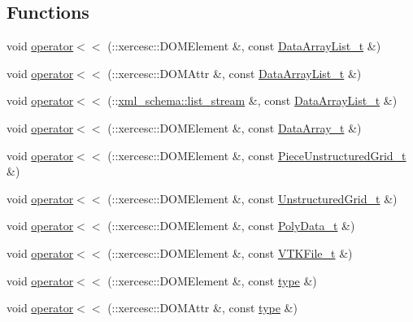 \subsection*{Functions}
\begin{DoxyCompactItemize}
\item 
void \hyperlink{vtk-unstructured_8h_a2721bf53923d5c5970c933ae5921f4dc}{operator$<$$<$} (\+::xercesc\+::\+D\+O\+M\+Element \&, const \hyperlink{classDataArrayList__t}{Data\+Array\+List\+\_\+t} \&)
\item 
void \hyperlink{vtk-unstructured_8h_a24556fd48a78f322cb82d7bcdc9c4ab9}{operator$<$$<$} (\+::xercesc\+::\+D\+O\+M\+Attr \&, const \hyperlink{classDataArrayList__t}{Data\+Array\+List\+\_\+t} \&)
\item 
void \hyperlink{vtk-unstructured_8h_a50f994a7e4e7766ad192e07d443a14e5}{operator$<$$<$} (\+::\hyperlink{namespacexml__schema_ab6c818ac91e70a25620375e0d000be83}{xml\+\_\+schema\+::list\+\_\+stream} \&, const \hyperlink{classDataArrayList__t}{Data\+Array\+List\+\_\+t} \&)
\item 
void \hyperlink{vtk-unstructured_8h_a1ef510bc9917a229ea37ca7045a47099}{operator$<$$<$} (\+::xercesc\+::\+D\+O\+M\+Element \&, const \hyperlink{classDataArray__t}{Data\+Array\+\_\+t} \&)
\item 
void \hyperlink{vtk-unstructured_8h_a126131a4ada1026f6eb13998253e4800}{operator$<$$<$} (\+::xercesc\+::\+D\+O\+M\+Element \&, const \hyperlink{classPieceUnstructuredGrid__t}{Piece\+Unstructured\+Grid\+\_\+t} \&)
\item 
void \hyperlink{vtk-unstructured_8h_a4f19051c77ec836cb7beb9b68906631c}{operator$<$$<$} (\+::xercesc\+::\+D\+O\+M\+Element \&, const \hyperlink{classUnstructuredGrid__t}{Unstructured\+Grid\+\_\+t} \&)
\item 
void \hyperlink{vtk-unstructured_8h_a3c9c02d91057a8a29257177e90534c59}{operator$<$$<$} (\+::xercesc\+::\+D\+O\+M\+Element \&, const \hyperlink{classPolyData__t}{Poly\+Data\+\_\+t} \&)
\item 
void \hyperlink{vtk-unstructured_8h_a845f3985ea7fa7ecc6e7c7d77d1f8050}{operator$<$$<$} (\+::xercesc\+::\+D\+O\+M\+Element \&, const \hyperlink{classVTKFile__t}{V\+T\+K\+File\+\_\+t} \&)
\item 
void \hyperlink{vtk-unstructured_8h_af854f7b8e374accb10ab81c733522d94}{operator$<$$<$} (\+::xercesc\+::\+D\+O\+M\+Element \&, const \hyperlink{classtype}{type} \&)
\item 
void \hyperlink{vtk-unstructured_8h_a2be5209924ae2f707167fe61b493efe7}{operator$<$$<$} (\+::xercesc\+::\+D\+O\+M\+Attr \&, const \hyperlink{classtype}{type} \&)

\end{DoxyCompactItemize}
